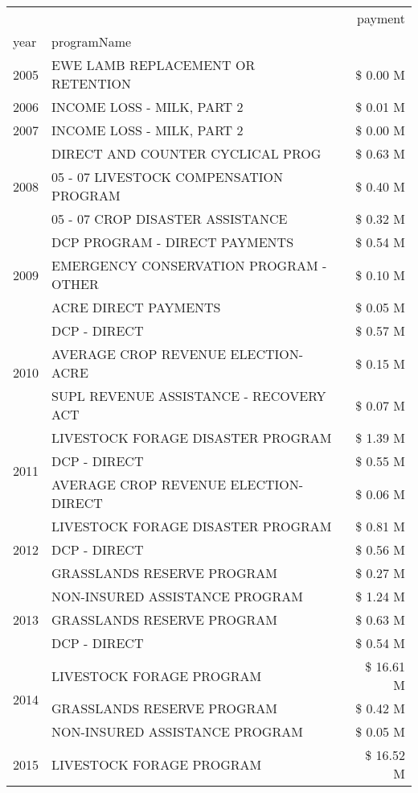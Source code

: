 \begin{tabular}{llr}
\toprule
 &  & payment \\
year & programName &  \\
\midrule
2005 & EWE LAMB REPLACEMENT OR RETENTION & \$ 0.00 M \\
\cline{1-3}
2006 & INCOME LOSS - MILK, PART 2 & \$ 0.01 M \\
\cline{1-3}
2007 & INCOME LOSS - MILK, PART 2 & \$ 0.00 M \\
\cline{1-3}
\multirow[t]{3}{*}{2008} & DIRECT AND COUNTER CYCLICAL PROG & \$ 0.63 M \\
 & 05 - 07 LIVESTOCK COMPENSATION PROGRAM & \$ 0.40 M \\
 & 05 - 07 CROP DISASTER ASSISTANCE & \$ 0.32 M \\
\cline{1-3}
\multirow[t]{3}{*}{2009} & DCP PROGRAM - DIRECT PAYMENTS & \$ 0.54 M \\
 & EMERGENCY CONSERVATION PROGRAM - OTHER & \$ 0.10 M \\
 & ACRE DIRECT PAYMENTS & \$ 0.05 M \\
\cline{1-3}
\multirow[t]{3}{*}{2010} & DCP - DIRECT & \$ 0.57 M \\
 & AVERAGE CROP REVENUE ELECTION-ACRE & \$ 0.15 M \\
 & SUPL REVENUE ASSISTANCE - RECOVERY ACT & \$ 0.07 M \\
\cline{1-3}
\multirow[t]{3}{*}{2011} & LIVESTOCK FORAGE DISASTER PROGRAM & \$ 1.39 M \\
 & DCP - DIRECT & \$ 0.55 M \\
 & AVERAGE CROP REVENUE ELECTION-DIRECT & \$ 0.06 M \\
\cline{1-3}
\multirow[t]{3}{*}{2012} & LIVESTOCK FORAGE DISASTER PROGRAM & \$ 0.81 M \\
 & DCP - DIRECT & \$ 0.56 M \\
 & GRASSLANDS RESERVE PROGRAM & \$ 0.27 M \\
\cline{1-3}
\multirow[t]{3}{*}{2013} & NON-INSURED ASSISTANCE PROGRAM & \$ 1.24 M \\
 & GRASSLANDS RESERVE PROGRAM & \$ 0.63 M \\
 & DCP - DIRECT & \$ 0.54 M \\
\cline{1-3}
\multirow[t]{3}{*}{2014} & LIVESTOCK FORAGE PROGRAM & \$ 16.61 M \\
 & GRASSLANDS RESERVE PROGRAM & \$ 0.42 M \\
 & NON-INSURED ASSISTANCE PROGRAM & \$ 0.05 M \\
\cline{1-3}
\multirow[t]{3}{*}{2015} & LIVESTOCK FORAGE PROGRAM & \$ 16.52 M \\

\end{tabular}
